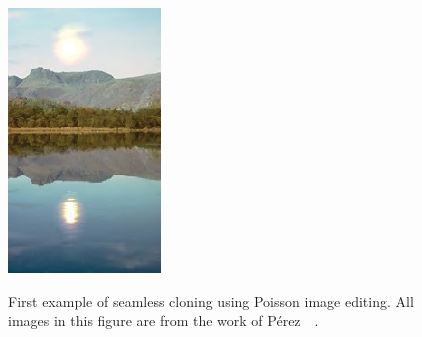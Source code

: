 \documentclass[11pt]{hyu_thesis}
\begin{document}
\begin{figure}
	{
		\includegraphics[height=0.28\textheight]{poisson_seamless_cloning1.eps}
	}
	\caption{First example of seamless cloning using Poisson image editing. All images in this figure are from the work of P{\'e}rez~\etal~\cite{Perez2003}.}
	\label{fig:seamless_cloning1}
\end{figure}
\end{document}
